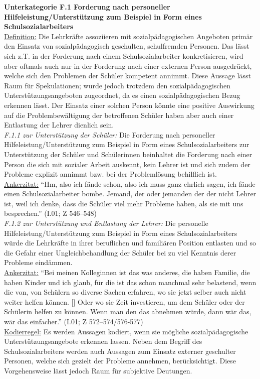 \noindent
\textbf{Unterkategorie F.1 Forderung nach personeller Hilfeleistung/Unterstützung zum Beispiel in Form eines Schulsozialarbeiters}\\
\underline{Definition:} Die Lehrkräfte assoziieren mit sozialpädagogischen Angeboten primär den Einsatz von sozialpädagogisch geschulten, schulfremden Personen. Das lässt sich z.T. in der Forderung nach einem Schulsozialarbeiter konkretisieren, wird aber oftmals auch nur in der Forderung nach einer externen Person ausgedrückt, welche sich den Problemen der Schüler kompetent annimmt. Diese Aussage lässt Raum für Spekulationen; wurde jedoch trotzdem den sozialpädagogischen Unterstützungsangeboten zugeordnet, da es einen sozialpädagogischen Bezug erkennen lässt. Der Einsatz einer solchen Person könnte eine positive Auswirkung auf die Problembewältigung der betroffenen Schüler haben aber auch einer Entlastung der Lehrer dienlich sein.\\
\textit{F.1.1 zur Unterstützung der Schüler:} Die Forderung nach personeller Hilfeleistung/Unterstützung zum Beispiel in Form eines Schulsozialarbeiters zur Unterstützung der Schüler und Schülerinnen beinhaltet die Forderung nach einer Person die sich mit sozialer Arbeit auskennt, kein Lehrer ist und sich zudem der Probleme explizit annimmt bzw. bei der Problemlösung behilflich ist.\\
\underline{Ankerzitat:} "`Hm, also ich fände schon, also ich muss ganz ehrlich sagen, ich fände einen Schulsozialarbeiter bombe. Jemand, der oder jemanden der der nicht Lehrer ist, weil ich denke, dass die Schüler viel mehr Probleme haben, als sie mit uns besprechen."' (I.01; Z 546--548)\\
\textit{F.1.2 zur Unterstützung und Entlastung der Lehrer:} Die personelle Hilfeleistung/Unterstützung zum Beispiel in Form eines Schulsozialarbeiters würde die Lehrkräfte in ihrer beruflichen und familiären Position entlasten und so die Gefahr einer Ungleichbehandlung der Schüler bei zu viel Kenntnis derer Probleme eindämmen.\\
\underline{Ankerzitat:} "`Bei meinen Kolleginnen ist das was anderes, die haben Familie, die haben Kinder und ich glaub, für die ist das schon manchmal sehr belastend, wenn die von, von Schülern so diverse Sachen erfahren, wo sie jetzt selber auch nicht weiter helfen können. [\punkte] Oder wo sie Zeit investieren, um dem Schüler oder der Schülerin helfen zu können. Wenn man den das abnehmen würde, dann wär das, wär das einfacher."' (I.01; Z 572--574/576-577)\\
\underline{Kodierregel:} Es werden Aussagen kodiert, wenn sie mögliche sozialpädagogische Unterstützungsangebote erkennen lassen. Neben dem Begriff des Schulsozialarbeiters werden auch Aussagen zum Einsatz externer geschulter Personen, welche sich gezielt der Probleme annehmen, berücksichtigt. Diese Vorgehensweise lässt jedoch Raum für subjektive Deutungen.

